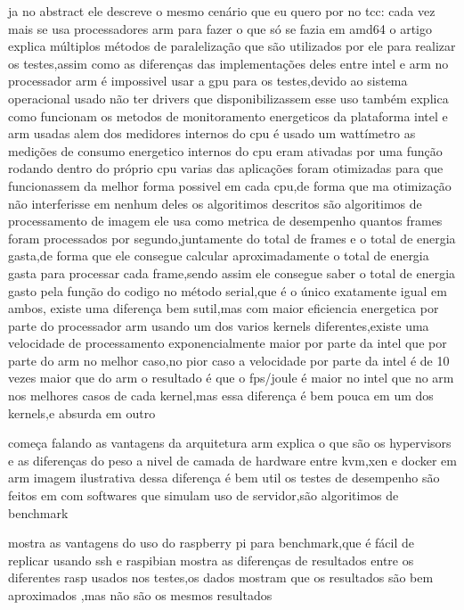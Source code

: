 \documentclass[
	12pt,				%
	openright,			%
	oneside,			%
	a4paper,			%
	english,			%
	french,				%
	spanish,			%
	brazil,				%
	]{abntex2}
\begin{document}
ja no abstract ele descreve o mesmo cenário que eu quero por no tcc: cada vez mais se usa processadores arm para fazer o que só se fazia em amd64
o artigo explica múltiplos métodos de paralelização que são utilizados por ele para realizar os testes,assim como as diferenças das implementações deles entre intel e arm
no processador arm é impossivel usar a gpu para os testes,devido ao sistema operacional usado não ter drivers que disponibilizassem esse uso
também explica como funcionam os metodos de monitoramento energeticos da plataforma intel e arm usadas
alem dos medidores internos do cpu é usado um wattímetro
as medições de consumo energetico internos do cpu eram ativadas por uma função rodando dentro do próprio cpu 
varias das aplicações foram otimizadas para que funcionassem da melhor forma possivel em cada cpu,de forma que ma otimização não interferisse em nenhum deles
os algoritimos descritos são algoritimos de processamento de imagem
ele usa como metrica de desempenho quantos frames foram processados por segundo,juntamente do total de frames e o total de energia gasta,de forma que ele consegue calcular aproximadamente o total de energia gasta para processar cada frame,sendo assim ele consegue saber o total de energia gasto pela função do codigo
no método serial,que é o único exatamente igual em ambos, existe uma diferença bem sutil,mas com maior eficiencia energetica por parte do processador arm
usando um dos varios kernels diferentes,existe uma velocidade de processamento exponencialmente maior por parte da intel que por parte do arm no melhor caso,no pior caso a velocidade por parte da intel é de 10 vezes maior que do arm
o resultado é que o fps/joule é maior no intel que no arm nos melhores casos de cada kernel,mas essa diferença é bem pouca em um dos kernels,e absurda em outro
\cite{armvsintel}

começa falando as vantagens da arquitetura arm
explica o que são os hypervisors e as diferenças do peso a nivel de camada de hardware entre kvm,xen e docker em arm
imagem ilustrativa dessa diferença é bem util
os testes de desempenho são feitos em com softwares que simulam uso de servidor,são algoritimos de benchmark
\cite{KVMXenDocker}

mostra as vantagens do uso do raspberry pi para benchmark,que é fácil de replicar usando ssh e raspibian
mostra as diferenças de resultados entre os diferentes rasp usados nos testes,os dados mostram que os resultados são bem aproximados ,mas não são os mesmos resultados
\cite{rpiplatformreplicable}
\end{document}
